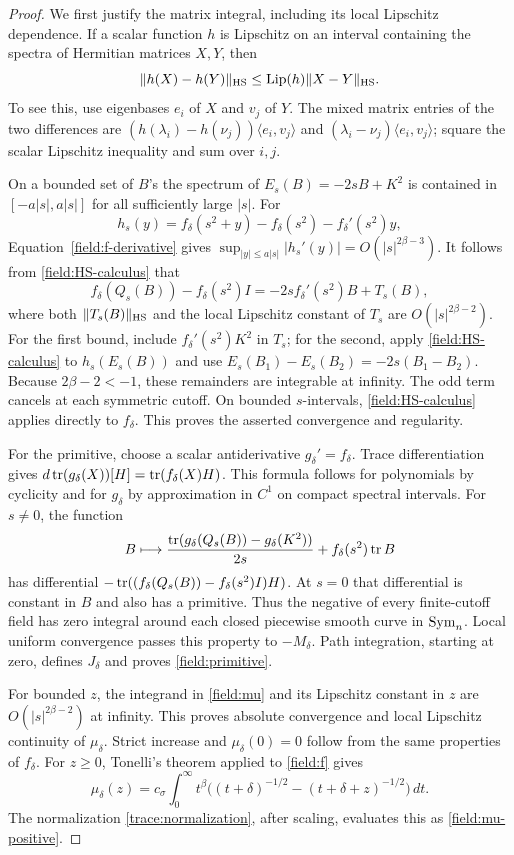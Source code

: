 \begin{proof}
We first justify the matrix integral, including its local Lipschitz
dependence.  If a scalar function $h$ is Lipschitz on an interval
containing the spectra of Hermitian matrices $X,Y$, then
\begin{equation}\label{field:HS-calculus}
 \|h(X)-h(Y)\|_{\mathrm{HS}}\leq\operatorname{Lip}(h)\|X-Y\|_{\mathrm{HS}}.
\end{equation}
To see this, use eigenbases $e_i$ of $X$ and $v_j$ of $Y$.
The mixed matrix entries of the two differences are
$(h(\lambda_i)-h(\nu_j))\langle e_i,v_j\rangle$ and
$(\lambda_i-\nu_j)\langle e_i,v_j\rangle$; square the scalar
Lipschitz inequality and sum over $i,j$.

On a bounded set of $B$'s the spectrum of
$E_s(B)=-2sB+K^2$ is contained in $[-a|s|,a|s|]$ for all sufficiently
large $|s|$.  For
\[
 h_s(y)=f_\delta(s^2+y)-f_\delta(s^2)-f_\delta'(s^2)y,
\]
Equation~\eqref{field:f-derivative} gives
$\sup_{|y|\leq a|s|}|h_s'(y)|=O(|s|^{2\beta-3})$.
It follows from \eqref{field:HS-calculus} that
\[
 f_\delta(Q_s(B))-f_\delta(s^2)I
      =-2s f_\delta'(s^2)B+T_s(B),
\]
where both $\|T_s(B)\|_{\mathrm{HS}}$ and the local Lipschitz constant of
$T_s$ are $O(|s|^{2\beta-2})$.  For the first bound, include
$f_\delta'(s^2)K^2$ in $T_s$; for the second, apply
\eqref{field:HS-calculus} to $h_s(E_s(B))$ and use
$E_s(B_1)-E_s(B_2)=-2s(B_1-B_2)$.
Because $2\beta-2<-1$, these remainders are integrable at infinity.
The odd term cancels at each symmetric cutoff.  On bounded
$s$-intervals, \eqref{field:HS-calculus} applies directly to
$f_\delta$.  This proves the asserted convergence and regularity.

For the primitive, choose a scalar antiderivative
$g_\delta'=f_\delta$.  Trace differentiation gives
$d\operatorname{tr}(g_\delta(X))[H]=\operatorname{tr}(f_\delta(X)H)$.
This formula follows for polynomials by cyclicity and for
$g_\delta$ by approximation in $C^1$ on compact spectral intervals.
For $s\ne0$, the function
\[
 B\longmapsto
 \frac{\operatorname{tr}(g_\delta(Q_s(B))-g_\delta(K^2))}{2s}
                  +f_\delta(s^2)\operatorname{tr} B
\]
has differential
$-\operatorname{tr}((f_\delta(Q_s(B))-f_\delta(s^2)I)H)$.
At $s=0$ that differential is constant in $B$ and also has a
primitive.  Thus the negative of every finite-cutoff field has
zero integral around each closed piecewise smooth curve in
$\operatorname{Sym}_n$.  Local uniform convergence passes this property to
$-M_\delta$.  Path integration, starting at zero, defines
$J_\delta$ and proves \eqref{field:primitive}.

For bounded $z$, the integrand in \eqref{field:mu} and its
Lipschitz constant in $z$ are $O(|s|^{2\beta-2})$ at infinity.
This proves absolute convergence and local Lipschitz continuity
of $\mu_\delta$.  Strict increase and $\mu_\delta(0)=0$ follow
from the same properties of $f_\delta$.  For $z\geq0$,
Tonelli's theorem applied to \eqref{field:f} gives
\[
 \mu_\delta(z)=c_\sigma\int_0^\infty t^\beta
       \bigl((t+\delta)^{-1/2}-(t+\delta+z)^{-1/2}\bigr)\,dt.
\]
The normalization \eqref{trace:normalization}, after scaling,
evaluates this as \eqref{field:mu-positive}.


\end{proof}
